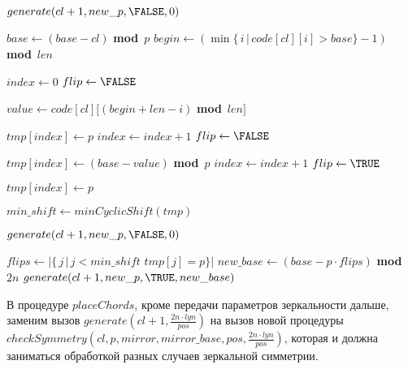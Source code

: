 \documentclass[a4paper,12pt]{article}
\def\MOD{{\bf mod} \,}
\theoremstyle{plain}
\theoremstyle{definition}
\begin{document}
\begin{algorithm}[!t]\label{algorithm:checkSymmetry}\small
\caption{\small$checkSymmetry(cl, p, m, base, len, new\_p)$} 
\begin{algorithmic}[1]

        \STATE $generate(cl + 1, new\_p, \FALSE, 0)$
        \RETURN
    \ENDIF

    \STATE $base \leftarrow (base - cl)$ \MOD $p$
    \STATE $begin \leftarrow (\min \{ \, i \, | \, code[cl] [i] > base\} - 1)$ \MOD $len$

    \STATE $index \leftarrow 0$
    \STATE $flip \leftarrow \FALSE$

        \STATE $value \leftarrow code[cl] [ (begin + len - i)$ \MOD $len ]$

            \STATE $tmp[index] \leftarrow p$
            \STATE $index \leftarrow index + 1$
            \STATE $flip \leftarrow \FALSE$
        \ENDIF

            \STATE $tmp[index] \leftarrow (base - value)$ \MOD $p$
            \STATE $index \leftarrow index + 1$
        \ELSE
            \STATE $flip \leftarrow \TRUE$
        \ENDIF
    \ENDFOR

        \STATE $tmp[index] \leftarrow p$
    \ENDIF

    \STATE $min\_shift \leftarrow minCyclicShift(tmp)$

        \STATE $generate(cl + 1, new\_p, \FALSE, 0)$
        \RETURN
    \ENDIF

        \STATE $flips \leftarrow |\{ \, j \, | \, j < min\_shift$ \AND $tmp[j] = p \}|$
        \STATE $new\_base \leftarrow (base - p \cdot flips)$ \MOD $2 n$
        \STATE $generate(cl + 1, new\_p, \TRUE, new\_base)$
    \ENDIF
\end{algorithmic}
\end{algorithm}

В процедуре $placeChords$, кроме передачи параметров зеркальности дальше, заменим вызов $generate(cl + 1, \frac{2 n \cdot lyn}{pos})$
на вызов новой процедуры $checkSymmetry(cl, p, mirror, mirror\_base, pos, \frac{2 n \cdot lyn}{pos})$, которая и должна заниматься
обработкой разных случаев зеркальной симметрии.
\end{document}
